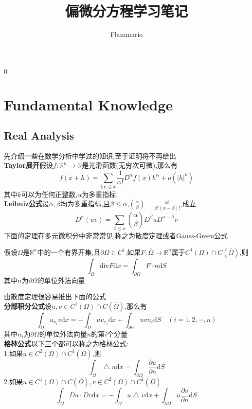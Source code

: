 \documentclass[a4paper,UTF8,12pt]{ctexart}
\title{偏微分方程学习笔记}
\author{Flammario}
\date{\quad }
\begin{document}
0\maketitle
\thispagestyle{empty}
\newpage
\tableofcontents
\thispagestyle{empty}
\newpage
\setcounter{page}{1}
\section{Fundamental Knowledge}
\subsection{Real Analysis}
先介绍一些在数学分析中学过的知识,至于证明将不再给出\\
\textbf{Taylor展开}\quad 假设$f:\mathbb{R}^n\to\mathbb{R}$是光滑函数(无穷次可微),那么有
$$
f(x+h) = \sum_{|\alpha|\leqslant k}\frac{1}{\alpha !}D^{\alpha}f(x)h^{\alpha}+o (|h|^{k})
$$
其中$k$可以为任何正整数,$\alpha$为多重指标.\\
\textbf{Leibniz公式}\quad 设$\alpha,\beta$均为多重指标,且$\beta\leqslant \alpha$,$\binom{\alpha}{\beta} = \frac{\alpha !}{\beta !(\alpha-\beta)!}$,成立
$$
D^{\alpha}(uv) = \sum_{\beta\leqslant \alpha}\binom{\alpha}{\beta}D^{\beta}uD^{\alpha-\beta}v
$$
下面的定理在多元微积分中非常常见,称之为散度定理或者Gauss-Green公式
\begin{tcolorbox}[colback=red!5!white,colframe=gray!75!black,title=\textbf{Gauss-Green公式},sharpish corners]
    假设$\Omega$是$\mathbb{R}^n$中的一个有界开集,且$\partial\Omega\in C^1$.如果$F:\bar{\Omega}\to\mathbb{R}^n$属于$C^1(\Omega)\cap C(\bar{\Omega})$,则
    $$
    \int_\Omega\mathrm{div}F\mathrm{d}x = \int_{\partial \Omega} F\cdot n\mathrm{d}S
    $$
    其中$n$为$\partial\Omega$的单位外法向量
\end{tcolorbox}
由散度定理很容易推出下面的公式\\
\textbf{分部积分公式}\quad 设$u,v\in C^1(\Omega )\cap C(\bar{\Omega})$,那么有
$$
\int_\Omega u_{x_i}v \mathrm{d}x = -\int_\Omega uv_{x_i}\mathrm{d}x + \int_{\partial \Omega} uvn_i\mathrm{d}S\quad (i=1,2,\cdots,n)
$$
其中$n_i$为$\partial\Omega$的单位外法向量$n$的第$i$个分量\\
\textbf{格林公式}\quad 以下三个都可以称之为格林公式:\\
1.如果$u\in C^2(\Omega )\cap C^1(\bar{\Omega})$,则
$$
\int_\Omega \bigtriangleup u\mathrm{d}x = \int_{\partial \Omega}\frac{\partial u}{\partial n}\mathrm{d}S
$$
2.如果$u\in C^1(\Omega )\cap C(\bar{\Omega}),v\in C^2(\Omega )\cap C^1(\bar{\Omega})$
$$
\int_\Omega Du\cdot Dv\mathrm{d}x = -\int_\Omega u\bigtriangleup v\mathrm{d}x+\int_{\partial \Omega}u\frac{\partial v}{\partial n}\mathrm{d}S
$$
\end{document}
